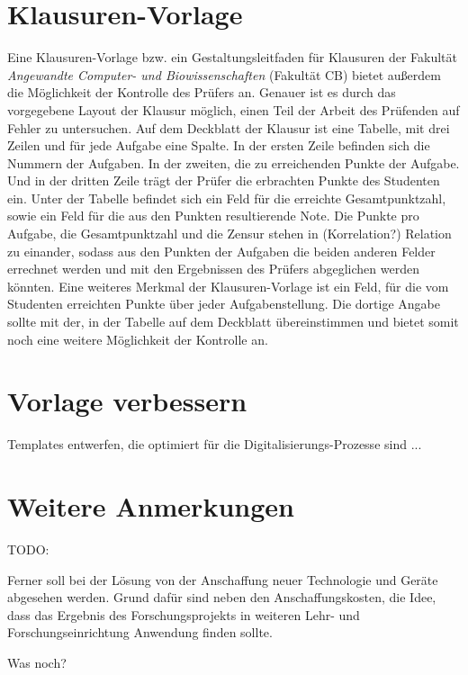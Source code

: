 \documentclass[nomenclature, 150]{HSMW-Thesis}
\begin{document}
	\section{Klausuren-Vorlage}
	Eine Klausuren-Vorlage bzw. ein Gestaltungsleitfaden für Klausuren der Fakultät \textit{Angewandte Computer- und Biowissenschaften} (Fakultät CB) bietet außerdem die Möglichkeit der Kontrolle des Prüfers an. Genauer ist es durch das vorgegebene Layout der Klausur möglich, einen Teil der Arbeit des Prüfenden auf Fehler zu untersuchen. Auf dem Deckblatt der Klausur ist eine Tabelle, mit drei Zeilen und für jede Aufgabe eine Spalte. In der ersten Zeile befinden sich die Nummern der Aufgaben. In der zweiten, die zu erreichenden Punkte der Aufgabe. Und in der dritten Zeile trägt der Prüfer die erbrachten Punkte des Studenten ein. Unter der Tabelle befindet sich ein Feld für die erreichte Gesamtpunktzahl, sowie ein Feld für die aus den Punkten resultierende Note. Die Punkte pro Aufgabe, die Gesamtpunktzahl und die Zensur stehen in (Korrelation?) Relation zu einander, sodass aus den Punkten der Aufgaben die beiden anderen Felder errechnet werden und mit den Ergebnissen des Prüfers abgeglichen werden könnten. Eine weiteres Merkmal der Klausuren-Vorlage ist ein Feld, für die vom Studenten erreichten Punkte über jeder Aufgabenstellung. Die dortige Angabe sollte mit der, in der Tabelle auf dem Deckblatt übereinstimmen und bietet somit noch eine weitere Möglichkeit der Kontrolle an.
	
	\section{Vorlage verbessern}
	
	
	Templates entwerfen, die optimiert für die Digitalisierungs-Prozesse sind ... 
	
	\section{Weitere Anmerkungen}
	TODO:
	
	Ferner soll bei der Lösung von der Anschaffung neuer Technologie und Geräte abgesehen werden. Grund dafür sind neben den Anschaffungskosten, die Idee, dass das Ergebnis des Forschungsprojekts in weiteren Lehr- und Forschungseinrichtung Anwendung finden sollte.
			
	Was noch?


\end{document}

